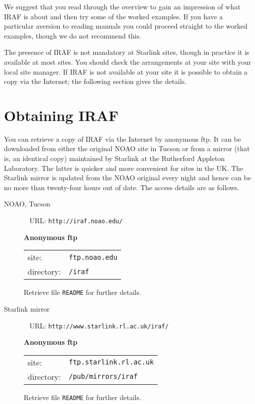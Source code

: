 \documentclass[twoside,11pt]{article}
\newcommand{\htmladdnormallink}[2]{#1}
\newcommand{\xlabel}[1]{}
\begin{document}
We suggest that you read through the overview to gain an impression
of what IRAF is about and then try some of the worked examples.  If
you have a particular aversion to reading manuals you could proceed
straight to the worked examples, though we do not recommend this.

The presence of IRAF is not mandatory at Starlink sites, though in
practice it is available at most sites.  You should check the
arrangements at your site with your local site manager.
If IRAF is not available at your site it is possible to obtain a copy
via the Internet; the following section gives the details.


\section{\xlabel{OBTAIN}\label{OBTAIN}Obtaining IRAF}

You can retrieve a copy of IRAF via the Internet by anonymous ftp.  It
can be downloaded from either the original NOAO site in Tucson or from a
mirror (that is, an identical copy) maintained by Starlink at the Rutherford
Appleton Laboratory.  The latter is quicker and more convenient for sites
in the UK.  The Starlink mirror is updated from the NOAO original every
night and hence can be no more than twenty-four hours out of date.  The
access details are as follows.

\begin{description}

  \item[NOAO, Tucson] ~
  \newline URL: \htmladdnormallink{ {\tt http://iraf.noao.edu/} }
   {http://iraf.noao.edu/}

   {\bf Anonymous ftp}

  \begin{tabular}{ll}
   site:      & {\tt ftp.noao.edu} \\
   directory: & {\tt /iraf}        \\
  \end{tabular}

   Retrieve file {\tt README} for further details.

  \item[Starlink mirror] ~
  \newline URL: \htmladdnormallink{ {\tt http://www.starlink.rl.ac.uk/iraf/} }
   {http://www.starlink.rl.ac.uk/iraf/}

   {\bf Anonymous ftp}

  \begin{tabular}{ll}
   site:      & {\tt ftp.starlink.rl.ac.uk} \\
   directory: & {\tt /pub/mirrors/iraf}     \\
  \end{tabular}

   Retrieve file {\tt README} for further details.

\end{description}
\end{document}
